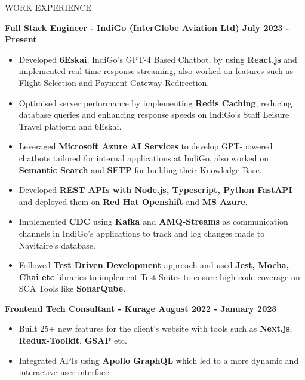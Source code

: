 \documentclass{resume} %
\begin{document}







\begin{rSection}{WORK EXPERIENCE}

{\bf Full Stack Engineer - IndiGo (InterGlobe Aviation Ltd)  \hfill July 2023 - Present }
\begin{itemize}
    \item {\normalfont Developed \textbf{6Eskai}, IndiGo's GPT-4 Based Chatbot, by using \textbf{React.js} and implemented real-time response streaming, also worked on features such as Flight Selection and Payment Gateway Redirection.}
    
    \item {\normalfont Optimised server performance by implementing \textbf{Redis Caching}, reducing database queries and enhancing response speeds on IndiGo’s Staff Leisure Travel platform and 6Eskai.}
    \item {\normalfont Leveraged \textbf{Microsoft Azure AI Services} to develop GPT-powered chatbots tailored for internal applications at IndiGo, also worked on \textbf{Semantic Search} and \textbf{SFTP} for building their Knowledge Base.}
    \item {\normalfont Developed \textbf{REST APIs with Node.js, Typescript, Python FastAPI} and deployed them on \textbf{Red Hat Openshift} and \textbf{MS Azure}.}
    \item {\normalfont Implemented \textbf{CDC} using \textbf{Kafka} and \textbf{AMQ-Streams} as communication channels in IndiGo's applications to track and log changes made to Navitaire's database.}
    \item {\normalfont Followed \textbf{Test Driven Development} approach and used \textbf{Jest, Mocha, Chai etc} libraries to implement Test Suites to ensure high code coverage on SCA Tools like \textbf{SonarQube}.}
\end{itemize}


{\bf Frontend Tech Consultant - Kurage  \hfill August 2022 - January 2023 }
\begin{itemize}

    \item {\normalfont  Built 25+ new features for the client's website with tools such as \textbf{{Next.js}}, \textbf{{Redux-Toolkit}}, \textbf{{GSAP}} etc. }
   \item {\normalfont Integrated APIs using \textbf{{Apollo GraphQL}} which led to a more dynamic and interactive user interface.} 
 
\end{itemize}

\end{rSection}
\end{document}
